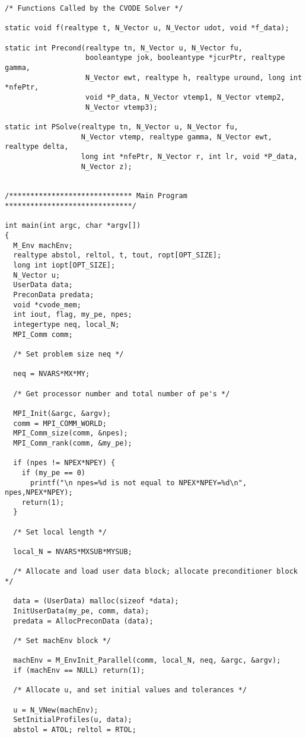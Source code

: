 \begin{verbatim}
/* Functions Called by the CVODE Solver */

static void f(realtype t, N_Vector u, N_Vector udot, void *f_data);

static int Precond(realtype tn, N_Vector u, N_Vector fu,
                   booleantype jok, booleantype *jcurPtr, realtype gamma,
                   N_Vector ewt, realtype h, realtype uround, long int *nfePtr,
                   void *P_data, N_Vector vtemp1, N_Vector vtemp2,
                   N_Vector vtemp3);

static int PSolve(realtype tn, N_Vector u, N_Vector fu,
                  N_Vector vtemp, realtype gamma, N_Vector ewt, realtype delta,
                  long int *nfePtr, N_Vector r, int lr, void *P_data,
                  N_Vector z);


/***************************** Main Program ******************************/

int main(int argc, char *argv[])
{
  M_Env machEnv;
  realtype abstol, reltol, t, tout, ropt[OPT_SIZE];
  long int iopt[OPT_SIZE];
  N_Vector u;
  UserData data;
  PreconData predata;
  void *cvode_mem;
  int iout, flag, my_pe, npes;
  integertype neq, local_N;
  MPI_Comm comm;

  /* Set problem size neq */

  neq = NVARS*MX*MY;

  /* Get processor number and total number of pe's */

  MPI_Init(&argc, &argv);
  comm = MPI_COMM_WORLD;
  MPI_Comm_size(comm, &npes);
  MPI_Comm_rank(comm, &my_pe);

  if (npes != NPEX*NPEY) {
    if (my_pe == 0)
      printf("\n npes=%d is not equal to NPEX*NPEY=%d\n", npes,NPEX*NPEY);
    return(1);
  }

  /* Set local length */

  local_N = NVARS*MXSUB*MYSUB;

  /* Allocate and load user data block; allocate preconditioner block */

  data = (UserData) malloc(sizeof *data);
  InitUserData(my_pe, comm, data);
  predata = AllocPreconData (data);

  /* Set machEnv block */

  machEnv = M_EnvInit_Parallel(comm, local_N, neq, &argc, &argv);
  if (machEnv == NULL) return(1);

  /* Allocate u, and set initial values and tolerances */ 

  u = N_VNew(machEnv);
  SetInitialProfiles(u, data);
  abstol = ATOL; reltol = RTOL;


\end{verbatim}
